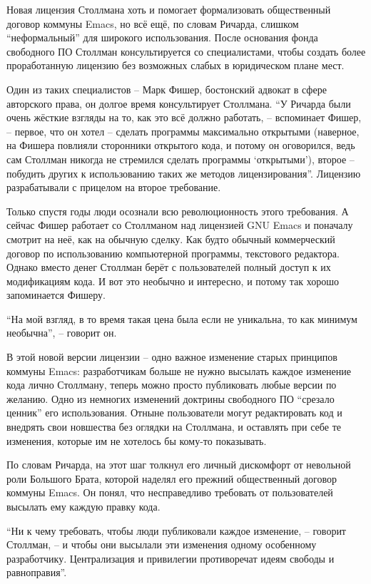 Новая лицензия Столлмана хоть и помогает формализовать общественный договор коммуны Emacs, но всё ещё, по словам Ричарда, слишком \enquote{неформальный} для широкого использования. После основания фонда свободного ПО Столлман консультируется со специалистами, чтобы создать более проработанную лицензию без возможных слабых в юридическом плане мест.

Один из таких специалистов -- Марк Фишер, бостонский адвокат в сфере авторского права, он долгое время консультирует Столлмана. \enquote{У Ричарда были очень жёсткие взгляды на то, как это всё должно работать, -- вспоминает Фишер, -- первое, что он хотел -- сделать программы максимально открытыми (наверное, на Фишера повлияли сторонники открытого кода, и потому он оговорился, ведь сам Столлман никогда не стремился сделать программы \enquote{открытыми}), второе -- побудить других к использованию таких же методов лицензирования}. Лицензию разрабатывали с прицелом на второе требование.

Только спустя годы люди осознали всю революционность этого требования. А сейчас Фишер работает со Столлманом над лицензией GNU Emacs и поначалу смотрит на неё, как на обычную сделку. Как будто обычный коммерческий договор по использованию компьютерной программы, текстового редактора. Однако вместо денег Столлман берёт с пользователей полный доступ к их модификациям кода. И вот это необычно и интересно, и потому так хорошо запоминается Фишеру.

\enquote{На мой взгляд, в то время такая цена была если не уникальна, то как минимум необычна}, -- говорит он.

В этой новой версии лицензии -- одно важное изменение старых принципов коммуны Emacs: разработчикам больше не нужно высылать каждое изменение кода лично Столлману, теперь можно просто публиковать любые версии по желанию. Одно из немногих изменений доктрины свободного ПО \enquote{срезало ценник} его использования. Отныне пользователи могут редактировать код и внедрять свои новшества без оглядки на Столлмана, и оставлять при себе те изменения, которые им не хотелось бы кому-то показывать.

По словам Ричарда, на этот шаг толкнул его личный дискомфорт от невольной роли Большого Брата, которой наделял его прежний общественный договор коммуны Emacs. Он понял, что несправедливо требовать от пользователей высылать ему каждую правку кода.

\enquote{Ни к чему требовать, чтобы люди публиковали каждое изменение, -- говорит Столлман, -- и чтобы они высылали эти изменения одному особенному разработчику. Централизация и привилегии противоречат идеям свободы и равноправия}.

